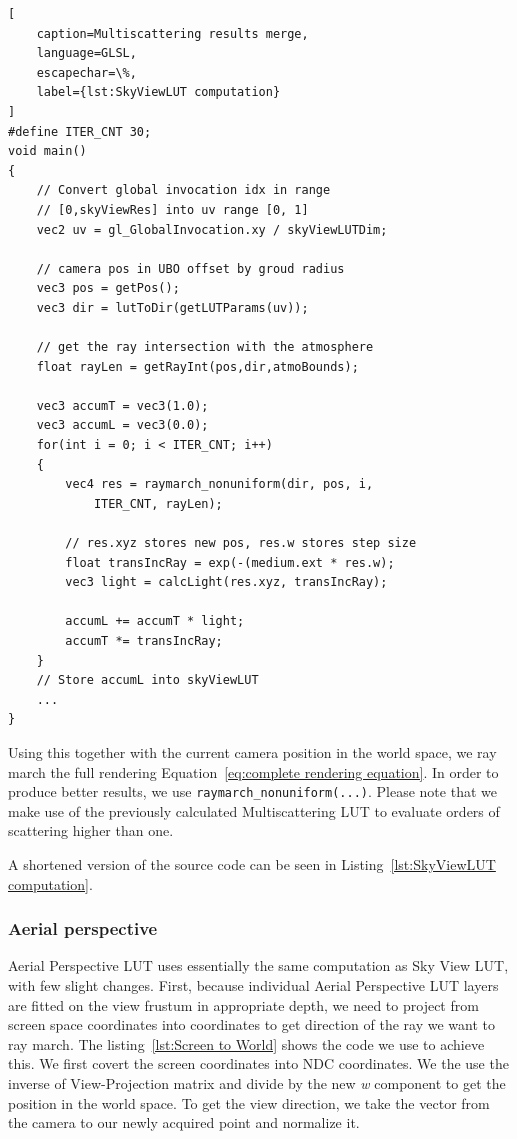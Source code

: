\documentclass{ctuthesis}
\begin{document}
\begin{lstlisting}[ 
    caption=Multiscattering results merge,
    language=GLSL,
    escapechar=\%,
    label={lst:SkyViewLUT computation}
]
#define ITER_CNT 30;
void main()
{
    // Convert global invocation idx in range 
    // [0,skyViewRes] into uv range [0, 1] 
    vec2 uv = gl_GlobalInvocation.xy / skyViewLUTDim;

    // camera pos in UBO offset by groud radius 
    vec3 pos = getPos();
    vec3 dir = lutToDir(getLUTParams(uv));
    
    // get the ray intersection with the atmosphere
    float rayLen = getRayInt(pos,dir,atmoBounds);
    
    vec3 accumT = vec3(1.0);
    vec3 accumL = vec3(0.0);
    for(int i = 0; i < ITER_CNT; i++)
    {
        vec4 res = raymarch_nonuniform(dir, pos, i,
            ITER_CNT, rayLen);

        // res.xyz stores new pos, res.w stores step size
        float transIncRay = exp(-(medium.ext * res.w);
        vec3 light = calcLight(res.xyz, transIncRay); 

        accumL += accumT * light;
        accumT *= transIncRay;
    }
    // Store accumL into skyViewLUT 
    ...
}
\end{lstlisting}

Using this together with the current camera position in the world space, we ray march the full rendering
Equation~\ref{eq:complete rendering equation}. In order to produce better results, we use 
\verb|raymarch_nonuniform(...)|. Please note that we make use of the 
previously calculated Multiscattering LUT to evaluate orders of scattering higher than one.

A shortened version of the source code can be seen in Listing~\ref{lst:SkyViewLUT computation}.

\subsubsection{Aerial perspective}
\label{aerial perspective shader}
    Aerial Perspective LUT uses essentially the same computation as Sky View LUT, with few slight changes.
    First, because individual Aerial Perspective LUT layers are fitted on the view frustum in
    appropriate depth, we need to project from screen space coordinates into coordinates to get
    direction of the ray we want to ray march. The listing~\ref{lst:Screen to World} shows the code we
    use to achieve this. We first covert the screen coordinates into NDC coordinates. We the use
    the inverse of View-Projection matrix and divide by the new \textit{w} component to get 
    the position in the world space. To get the view direction, we take the vector from the camera to our newly
    acquired point and normalize it.
\end{document}
